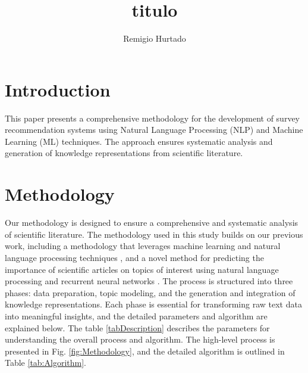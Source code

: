 \documentclass[runningheads]{llncs}
\begin{document}
%
\title{titulo}
%
%
\author{Remigio Hurtado}
%
%
%
\maketitle    
%
\begin{abstract}

\end{abstract}

\begin{keywords}

\end{keywords}

\section{Introduction}
This paper presents a comprehensive methodology for the development of survey recommendation systems using Natural Language Processing (NLP) and Machine Learning (ML) techniques. The approach ensures systematic analysis and generation of knowledge representations from scientific literature.

\section{Methodology}

Our methodology is designed to ensure a comprehensive and systematic analysis of scientific literature. The methodology used in this study builds on our previous work, including a methodology that leverages machine learning and natural language processing techniques \cite{Hurtado2023}, and a novel method for predicting the importance of scientific articles on topics of interest using natural language processing and recurrent neural networks \cite{Lopez2024}. The process is structured into three phases: data preparation, topic modeling, and the generation and integration of knowledge representations. Each phase is essential for transforming raw text data into meaningful insights, and the detailed parameters and algorithm are explained below. The table \ref{tabDescription} describes the parameters for understanding the overall process and algorithm. The high-level process is presented in Fig. \ref{fig:Methodology}, and the detailed algorithm is outlined in Table \ref{tab:Algorithm}.\\ 
\end{document}
